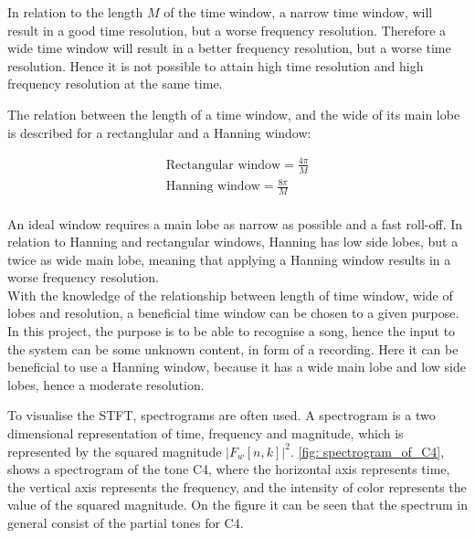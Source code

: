 In relation to the length $M$ of the time window, a narrow time window, will result in a good time resolution, but a worse frequency resolution. Therefore a wide time window will result in a better frequency resolution, but a worse time resolution. Hence it is not possible to attain high time resolution and high frequency resolution at the same time. 

The relation between the length of a time window, and the wide of its main lobe is described for a rectanglular and a Hanning window:

\begin{align*}
    \text{Rectangular window} = \frac{4\pi}{M} \\
    \text{Hanning window} = \frac{8\pi}{M}
\end{align*}
\cite{spectralaudioCH3}
\\
An ideal window requires a main lobe as narrow as possible and a fast roll-off\cite[56]{layer2015signal}. In relation to Hanning and rectangular windows, Hanning has low side lobes, but a twice as wide main lobe, meaning that applying a Hanning window results in a worse frequency resolution.
\\
With the knowledge of the relationship between length of time window, wide of lobes and resolution, a beneficial time window can be chosen to a given purpose.
In this project, the purpose is to be able to recognise a song, hence the input to the system can be some unknown content, in form of a recording. Here it can be beneficial to use a Hanning window, because it has a wide main lobe and low side lobes, hence a moderate resolution.



To visualise the STFT, spectrograms are often used. A spectrogram is a two dimensional representation of time, frequency and magnitude, which is represented by the squared magnitude $|F_w[n,k]|^2$.
\autoref{fig: spectrogram_of_C4}, shows a spectrogram of the tone C4, where the horizontal axis represents time, the vertical axis represents the frequency, and the intensity of color represents the value of the squared magnitude. On the figure it can be seen that the spectrum in general consist of the partial tones for C4. 

